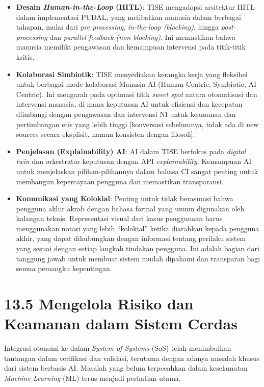 \documentclass[
  letterpaper,
  DIV=11,
  numbers=noendperiod]{scrreprt}
\providecommand{\tightlist}{%
  \setlength{\itemsep}{0pt}\setlength{\parskip}{0pt}}
\begin{document}
\begin{itemize}
\tightlist
\item
  \textbf{Desain \emph{Human-in-the-Loop} (HITL)}: TISE mengadopsi
  arsitektur HITL dalam implementasi PUDAL, yang melibatkan manusia
  dalam berbagai tahapan, mulai dari \emph{pre-processing},
  \emph{in-the-loop (blocking)}, hingga \emph{post-processing} dan
  \emph{parallel feedback (non-blocking)}. Ini memastikan bahwa manusia
  memiliki pengawasan dan kemampuan intervensi pada titik-titik kritis.
\item
  \textbf{Kolaborasi Simbiotik}: TISE menyediakan kerangka kerja yang
  fleksibel untuk berbagai mode kolaborasi Manusia-AI (Human-Centric,
  Symbiotic, AI-Centric). Ini mengarah pada optimasi titik \emph{sweet
  spot} antara otomatisasi dan intervensi manusia, di mana keputusan AI
  untuk efisiensi dan kecepatan diimbangi dengan pengawasan dan
  intervensi NI untuk keamanan dan pertimbangan etis yang lebih tinggi
  {[}konversasi sebelumnya, tidak ada di new sources secara eksplisit,
  namun konsisten dengan filosofi{]}.
\item
  \textbf{Penjelasan (Explainability) AI}: AI dalam TISE berfokus pada
  \emph{digital twin} dan orkestrator keputusan dengan API
  \emph{explainability}. Kemampuan AI untuk menjelaskan
  pilihan-pilihannya dalam bahasa CI sangat penting untuk membangun
  kepercayaan pengguna dan memastikan transparansi.
\item
  \textbf{Komunikasi yang Kolokial}: Penting untuk tidak berasumsi bahwa
  pengguna akhir akrab dengan bahasa formal yang umum digunakan oleh
  kalangan teknis. Representasi visual dari kasus penggunaan harus
  menggunakan notasi yang lebih ``kolokial'' ketika diarahkan kepada
  pengguna akhir, yang dapat dihubungkan dengan informasi tentang
  perilaku sistem yang sesuai dengan setiap langkah tindakan pengguna.
  Ini adalah bagian dari tanggung jawab untuk membuat sistem mudah
  dipahami dan transparan bagi semua pemangku kepentingan.
\end{itemize}

\section{\texorpdfstring{\textbf{13.5 Mengelola Risiko dan Keamanan
dalam Sistem
Cerdas}}{13.5 Mengelola Risiko dan Keamanan dalam Sistem Cerdas}}\label{mengelola-risiko-dan-keamanan-dalam-sistem-cerdas}

Integrasi otonomi ke dalam \emph{System of Systems} (SoS) telah
menimbulkan tantangan dalam verifikasi dan validasi, terutama dengan
adanya masalah khusus dari sistem berbasis AI. Masalah yang belum
terpecahkan dalam keselamatan \emph{Machine Learning} (ML) terus menjadi
perhatian utama.
\end{document}
